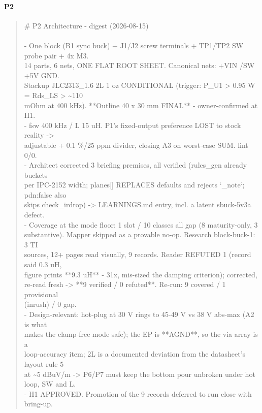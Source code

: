 \documentclass[11pt,a4paper]{article}
\begin{document}
\paragraph*{P2}
\begin{quote}\small\ttfamily\raggedright
\# P2 Architecture - digest (2026-08-15)\\
~\\
- One block (B1 sync buck) + J1/J2 screw terminals + TP1/TP2 SW probe pair + 4x M3.\\
  14 parts, 6 nets, ONE FLAT ROOT SHEET. Canonical nets: +VIN /SW +5V GND.\\
  Stackup JLC2313\_1.6 2L 1 oz CONDITIONAL (trigger: P\_U1 \textgreater{} 0.95 W = Rds\_LS \textgreater{} \textasciitilde{}110\\
  mOhm at 400 kHz). {*}{*}Outline 40 x 30 mm FINAL{*}{*} - owner-confirmed at H1.\\
- fsw 400 kHz / L 15 uH. P1's fixed-output preference LOST to stock reality -\textgreater{}\\
  adjustable + 0.1 \%/25 ppm divider, closing A3 on worst-case SUM. lint 0/0.\\
- Architect corrected 3 briefing premises, all verified (rules\_gen already buckets\\
  per IPC-2152 width; planes{[}{]} REPLACES defaults and rejects `\_note`; pdn:false also\\
  skips check\_irdrop) -\textgreater{} LEARNINGS.md entry, incl. a latent sbuck-5v3a defect.\\
- Coverage at the mode floor: 1 slot / 10 classes all gap (8 maturity-only, 3\\
  substantive). Mapper skipped as a provable no-op. Research block-buck-1: 3 TI\\
  sources, 12+ pages read visually, 9 records. Reader REFUTED 1 (record said 0.3 uH,\\
  figure prints {*}{*}9.3 uH{*}{*} - 31x, mis-sized the damping criterion); corrected,\\
  re-read fresh -\textgreater{} {*}{*}9 verified / 0 refuted{*}{*}. Re-run: 9 covered / 1 provisional\\
  (inrush) / 0 gap.\\
- Design-relevant: hot-plug at 30 V rings to 45-49 V vs 38 V abs-max (A2 is what\\
  makes the clamp-free mode safe); the EP is {*}{*}AGND{*}{*}, so the via array is a\\
  loop-accuracy item; 2L is a documented deviation from the datasheet's layout rule 5\\
  at \textasciitilde{}5 dBuV/m -\textgreater{} P6/P7 must keep the bottom pour unbroken under hot loop, SW and L.\\
- H1 APPROVED. Promotion of the 9 records deferred to run close with bring-up.
\end{quote}
\end{document}

